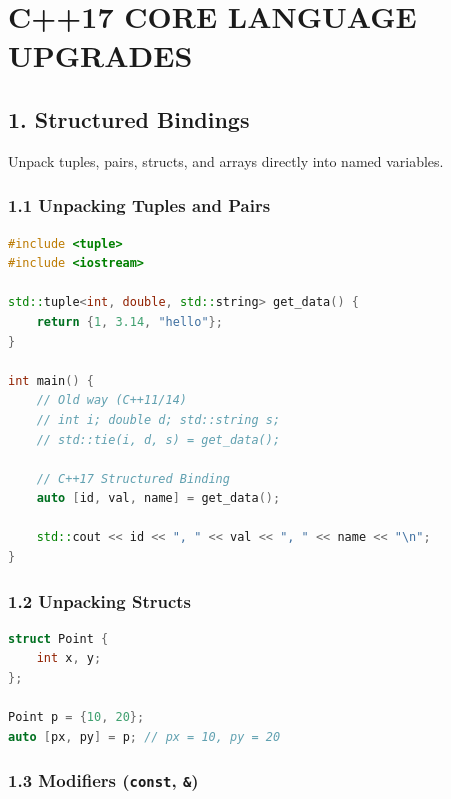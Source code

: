 \hypertarget{c17-core-language-upgrades}{%
\chapter{C++17 CORE LANGUAGE
UPGRADES}\label{c17-core-language-upgrades}}

\hypertarget{structured-bindings}{%
\section{1. Structured Bindings}\label{structured-bindings}}

Unpack tuples, pairs, structs, and arrays directly into named variables.

\hypertarget{unpacking-tuples-and-pairs}{%
\subsection{1.1 Unpacking Tuples and
Pairs}\label{unpacking-tuples-and-pairs}}

\begin{lstlisting}[language={C++}]
#include <tuple>
#include <iostream>

std::tuple<int, double, std::string> get_data() {
    return {1, 3.14, "hello"};
}

int main() {
    // Old way (C++11/14)
    // int i; double d; std::string s;
    // std::tie(i, d, s) = get_data();

    // C++17 Structured Binding
    auto [id, val, name] = get_data();
    
    std::cout << id << ", " << val << ", " << name << "\n";
}
\end{lstlisting}

\hypertarget{unpacking-structs}{%
\subsection{1.2 Unpacking Structs}\label{unpacking-structs}}

\begin{lstlisting}[language={C++}]
struct Point {
    int x, y;
};

Point p = {10, 20};
auto [px, py] = p; // px = 10, py = 20
\end{lstlisting}

\hypertarget{modifiers-const}{%
\subsection{\texorpdfstring{1.3 Modifiers (\texttt{const},
\texttt{\&})}{1.3 Modifiers (const, \&)}}\label{modifiers-const}}


